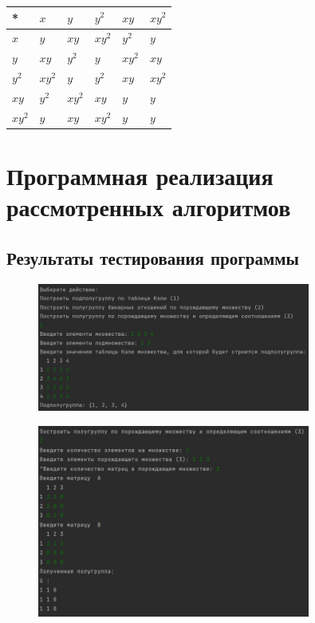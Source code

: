 \documentclass[bachelor, och, labwork]{shiza}
\begin{document}
\begin{table}[h]
    \begin{tabular}{|l|l|l|l|l|l|}
    \hline
    *      & $x$    & $y$    & $y^2$  & $xy$   & $xy^2$ \\ \hline
    $x$    & $y$    & $xy$   & $xy^2$ & $y^2$  & $y$    \\ \hline
    $y$    & $xy$   & $y^2$  & $y$    & $xy^2$ & $xy$   \\ \hline
    $y^2$  & $xy^2$ & $y$    & $y^2$  & $xy$   & $xy^2$ \\ \hline
    $xy$   & $y^2$  & $xy^2$ & $xy$   & $y$    & $y$    \\ \hline
    $xy^2$ & $y$    & $xy$   & $xy^2$ & $y$    & $y$    \\ \hline
    \end{tabular}
    \end{table}

\section{Программная реализация рассмотренных алгоритмов}
    
    \subsection{Результаты тестирования программы}

        \begin{figure}[H]
            \centering
            \includegraphics[width=0.8\textwidth]{pic/1.jpg}
            \caption{}
        \end{figure}

        \begin{figure}[H]
            \centering
            \includegraphics[width=0.8\textwidth]{pic/2.jpg}
            \caption{}
        \end{figure}
\end{document}
